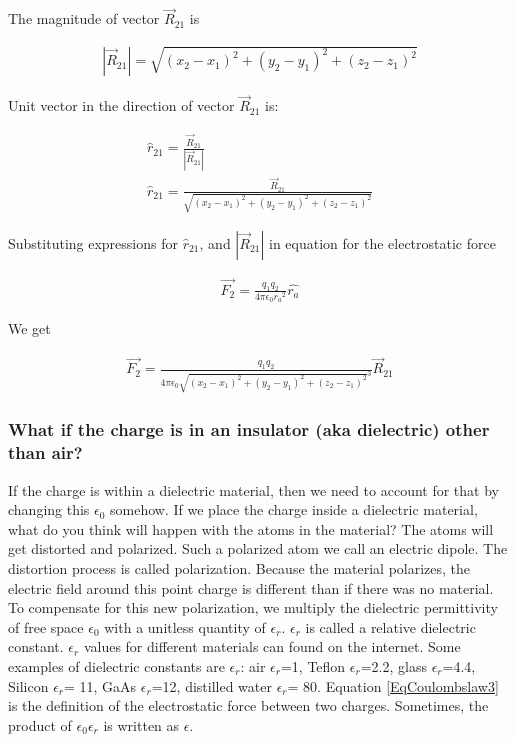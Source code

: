 \documentclass{ximera}
\begin{document}
\begin{example}
\begin{explanation}
The magnitude of vector $\vec{R}_{21}$ is


\begin{eqnarray}
|\vec{R}_{21}|= \sqrt{(x_2 - x_1)^2 +(y_2 - y_1)^2 +(z_2 - z_1)^2}
\end{eqnarray}

Unit vector in the direction of vector $\vec{R}_{21}$ is:


\begin{eqnarray}
\hat{r}_{21}= \frac{\vec{R}_{21}}{|\vec{R}_{21}|} \\
\hat{r}_{21}=\frac{\vec{R}_{21}}{\sqrt{(x_2 - x_1)^2 +(y_2 - y_1)^2 +(z_2 - z_1)^2}}
\end{eqnarray}

Substituting expressions for $\hat{r}_{21}$, and $|\vec{R}_{21}|$ in equation for the electrostatic force 

\begin{eqnarray}
\vec{F_2}=\frac{q_1 q_2}{4 \pi \epsilon_{0} {r_a}^2} \hat{r_a}
\end{eqnarray}

 

 
We get


\begin{eqnarray}
\vec{F_2}=\frac{q_1 q_2}{4 \pi \epsilon_{0} {\sqrt{(x_2 - x_1)^2 +(y_2 - y_1)^2 +(z_2 - z_1)^2}
}^3} \vec{R}_{21} \label{eqonecharge}
\end{eqnarray}







\end{explanation}


\end{example}




\subsubsection{What if the charge is in an insulator (aka dielectric) other than air?} 

If the charge is within a dielectric material, then we need to account for that by changing this $\epsilon_0$ somehow. If we place the charge inside a dielectric material, what do you think will happen with the atoms in the material? The atoms will get distorted and polarized. Such a polarized atom we call an electric dipole. The distortion process is called polarization. Because the material polarizes, the electric field around this point charge is different than if there was no material. To compensate for this new polarization, we multiply the dielectric permittivity of free space $\epsilon_0$ with a unitless quantity of $\epsilon_r$.  $\epsilon_r$ is called a relative dielectric constant. $\epsilon_r$ values for different materials can found on the internet. Some examples of dielectric constants are $\epsilon_r$: air $\epsilon_r$=1,  Teflon $\epsilon_r$=2.2, glass $\epsilon_r$=4.4, Silicon $\epsilon_r$= 11, GaAs $\epsilon_r$=12, distilled water $\epsilon_r$= 80.  Equation \ref{EqCoulombslaw3} is the definition of the electrostatic force between two charges. Sometimes, the product of $\epsilon_0 \epsilon_r$ is written as $\epsilon$.
\end{document}
